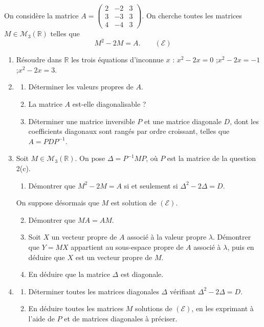 \documentclass[a4paper,11pt]{article}
\numberwithin{equation}{section}
\numberwithin{figure}{section}
\numberwithin{table}{section}
\theoremstyle{enonce}
\theoremstyle{exemple}
\theoremstyle{remarque}
\newcommand{\R}{\mathbb{R}}
\begin{document}
On considère la matrice $A=\begin{pmatrix}2&-2&3\\3&-3&3\\4&-4&3\end{pmatrix}$. On cherche toutes les matrices $M\in\mathcal M_3(\R)$ telles que
\[M^2-2M=A.\qquad(\mathcal E)\]
\begin{enumerate}
\item Résoudre dans $\R$ les trois équations d'inconnue $x$ : $x^2-2x=0$ ;\quad $x^2-2x=-1$ ;\quad $x^2-2x=3$.
\item
\begin{enumerate}[label=(\alph*)]
\item Déterminer les valeurs propres de $A$.
\item La matrice $A$ est-elle diagonalisable ?
\item Déterminer une matrice inversible $P$ et une matrice diagonale $D$, dont les coefficients diagonaux sont rangés par ordre croissant,
telles que $A=PDP^{-1}$.
\end{enumerate}
\item Soit $M\in\mathcal M_3(\R)$. On pose $\Delta=P^{-1}MP$, où $P$ est la matrice de la question 2(c).
\begin{enumerate}[label=(\alph*)]
\item Démontrer que $M^2-2M=A$ si et seulement si $\Delta^2-2\Delta=D$.
\end{enumerate}
On suppose désormais que $M$ est solution de $(\mathcal E)$.
\begin{enumerate}[label=(\alph*)]\setcounter{enumii}{1}
\item Démontrer que $MA=AM$.
\item Soit $X$ un vecteur propre de $A$ associé à la valeur propre $\lambda$. Démontrer que $Y=MX$ appartient au sous-espace propre de $A$
associé à $\lambda$, puis en déduire que $X$ est un vecteur propre de $M$.
\item En déduire que la matrice $\Delta$ est diagonale.
\end{enumerate}
\item
\begin{enumerate}[label=(\alph*)]
\item Déterminer toutes les matrices diagonales $\Delta$ vérifiant $\Delta^2-2\Delta=D$.
\item En déduire toutes les matrices $M$ solutions de $(\mathcal E)$, en les exprimant à l'aide de $P$ et de matrices diagonales à préciser.
\end{enumerate}

\end{enumerate}
\end{document}

